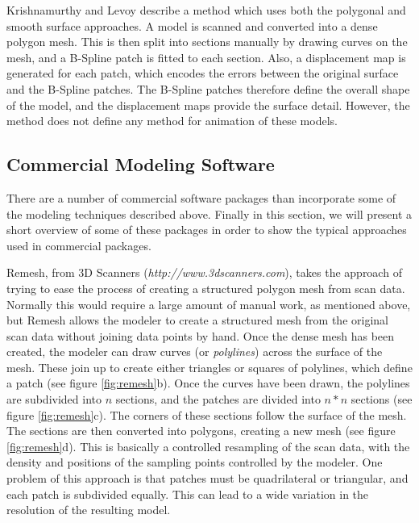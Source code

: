 \documentclass[10pt,oneside,fleqn,a4paper]{book}
\begin{document}
Krishnamurthy and Levoy \cite{Krishnamurthy96} describe a method which uses both the polygonal and smooth surface approaches. A model is scanned and converted into a dense polygon mesh. This is then split into sections manually by drawing curves on the mesh, and a B-Spline patch is fitted to each section. Also, a displacement map is generated for each patch, which encodes the errors between the original surface and the B-Spline patches. The B-Spline patches therefore define the overall shape of the model, and the displacement maps provide the surface detail. However, the method does not define any method for animation of these models.

\subsection{\label{sec:reviewsoftware}Commercial Modeling Software}

There are a number of commercial software packages than incorporate some of the modeling techniques described above. Finally in this section, we will present a short overview of some of these packages in order to show the typical approaches used in commercial packages.

Remesh, from 3D Scanners ({\it http://www.3dscanners.com}), takes the approach of trying to ease the process of creating a structured polygon mesh from scan data. Normally this would require a large amount of manual work, as mentioned above, but Remesh allows the modeler to create a structured mesh from the original scan data without joining data points by hand. Once the dense mesh has been created, the modeler can draw curves (or {\it polylines}) across the surface of the mesh. These join up to create either triangles or squares of polylines, which define a patch (see figure \ref{fig:remesh}b). Once the curves have been drawn, the polylines are subdivided into $n$ sections, and the patches are divided into $n*n$ sections (see figure \ref{fig:remesh}c). The corners of these sections follow the surface of the mesh. The sections are then converted into polygons, creating a new mesh (see figure \ref{fig:remesh}d). This is basically a controlled resampling of the scan data,  with the density and positions of the sampling points controlled by the modeler. One problem of this approach is that patches must be quadrilateral or triangular, and each patch is subdivided equally. This can lead to a wide variation in the resolution of the resulting model.
\end{document}
